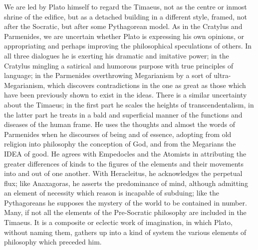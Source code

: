 \documentclass[11pt,letter]{article}
\begin{document}
\par  We are led by Plato himself to regard the Timaeus, not as the centre or inmost shrine of the edifice, but as a detached building in a different style, framed, not after the Socratic, but after some Pythagorean model. As in the Cratylus and Parmenides, we are uncertain whether Plato is expressing his own opinions, or appropriating and perhaps improving the philosophical speculations of others. In all three dialogues he is exerting his dramatic and imitative power; in the Cratylus mingling a satirical and humorous purpose with true principles of language; in the Parmenides overthrowing Megarianism by a sort of ultra-Megarianism, which discovers contradictions in the one as great as those which have been previously shown to exist in the ideas. There is a similar uncertainty about the Timaeus; in the first part he scales the heights of transcendentalism, in the latter part he treats in a bald and superficial manner of the functions and diseases of the human frame. He uses the thoughts and almost the words of Parmenides when he discourses of being and of essence, adopting from old religion into philosophy the conception of God, and from the Megarians the IDEA of good. He agrees with Empedocles and the Atomists in attributing the greater differences of kinds to the figures of the elements and their movements into and out of one another. With Heracleitus, he acknowledges the perpetual flux; like Anaxagoras, he asserts the predominance of mind, although admitting an element of necessity which reason is incapable of subduing; like the Pythagoreans he supposes the mystery of the world to be contained in number. Many, if not all the elements of the Pre-Socratic philosophy are included in the Timaeus. It is a composite or eclectic work of imagination, in which Plato, without naming them, gathers up into a kind of system the various elements of philosophy which preceded him.
\end{document}
